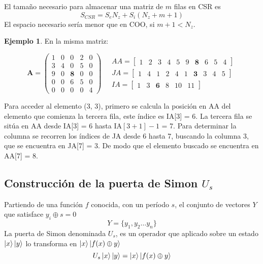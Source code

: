 \documentclass{article}
\newcommand*\mat[1]{ \begin{pmatrix} #1 \end{pmatrix}}
\newcommand*\arr[1]{ \begin{bmatrix} #1 \end{bmatrix}}
\theoremstyle{definition}
\newtheorem{ejemplo}{Ejemplo}[section]
\begin{document}
El tamaño necesario para almacenar una matriz de $m$ filas en CSR es
$$ S_{CSR} = S_e N_z + S_i (N_z + m + 1) $$
El espacio necesario sería menor que en COO, si $m + 1 < N_z$.

\begin{ejemplo} En la misma matriz:

$$ \textbf{A} = \mat{
	1 & 0 & 0 & 2 & 0 \\
	3 & 4 & 0 & 5 & 0 \\
	9 & 0 & \textbf{8} & 0 & 0 \\
	0 & 0 & 6 & 5 & 0 \\
	0 & 0 & 0 & 0 & 4 }
\quad
\begin{aligned}
	AA = \arr{ 1 & 2 & 3 & 4 & 5  & 9 & \textbf{8} & 6 & 5 & 4} \\
	JA = \arr{ 1 & 4 & 1 & 2 & 4  & 1 & \textbf{3} & 3 & 4 & 5}\\
	IA = \arr{ 1 & 3 & \textbf{6} & 8 & 10 & 11}
\end{aligned}
$$

Para acceder al elemento (3, 3), primero se calcula la posición en AA del 
elemento que comienza la tercera fila, este índice es IA[3] = 6. La tercera fila 
se sitúa en AA desde IA[3] = 6 hasta IA$[3+1]-1$ = 7.  Para determinar la 
columna se recorren los índices de JA desde 6 hasta 7, buscando la columna 3, 
que se encuentra en JA[7] = 3. De modo que el elemento buscado se encuentra en 
AA[7] = 8.

\end{ejemplo}

\subsection{Construcción de la puerta de Simon $U_s$}

Partiendo de una función $f$ conocida, con un período $s$, el conjunto de 
vectores $Y$ que satisface $y_i \oplus s = 0$
$$Y = \{ y_1, y_2 \ldots y_n \}$$
La puerta de Simon denominada $U_s$, es un operador que aplicado sobre un estado 
$\ket{x}\ket{y}$ lo transforma en $\ket{x}\ket{f(x) \oplus y}$
\begin{equation}
\label{Us_def} U_s\ket{x} \ket{y} = \ket{x} \ket{f(x) \oplus y}
\end{equation}
%
%
%

\end{document}
